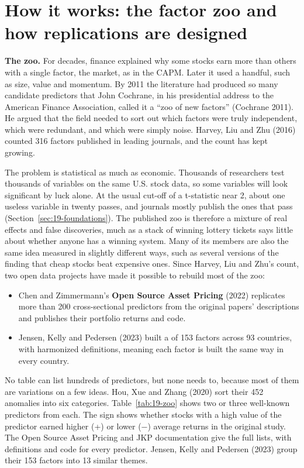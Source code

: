 \section{How it works: the factor zoo and how replications are designed}
\label{sec:19-how}

\textbf{The zoo.} For decades, finance explained why some stocks earn more than others with a single factor, the market, as in the CAPM. Later it used a handful, such as size, value and momentum. By 2011 the literature had produced so many candidate predictors that John Cochrane, in his presidential address to the American Finance Association, called it a ``zoo of new factors'' (Cochrane 2011). He argued that the field needed to sort out which factors were truly independent, which were redundant, and which were simply noise. Harvey, Liu and Zhu (2016) counted 316 factors published in leading journals, and the count has kept growing.

The problem is statistical as much as economic. Thousands of researchers test thousands of variables on the same U.S. stock data, so some variables will look significant by luck alone. At the usual cut-off of a t-statistic near 2, about one useless variable in twenty passes, and journals mostly publish the ones that pass (Section~\ref{sec:19-foundations}). The published zoo is therefore a mixture of real effects and false discoveries, much as a stack of winning lottery tickets says little about whether anyone has a winning system. Many of its members are also the same idea measured in slightly different ways, such as several versions of the finding that cheap stocks beat expensive ones. Since Harvey, Liu and Zhu's count, two open data projects have made it possible to rebuild most of the zoo:

\begin{itemize}
  \item Chen and Zimmermann's \textbf{Open Source Asset Pricing} (2022) replicates more than 200 cross-sectional predictors from the original papers' descriptions and publishes their portfolio returns and code.
  \item Jensen, Kelly and Pedersen (2023) built a  of 153 factors across 93 countries, with harmonized definitions, meaning each factor is built the same way in every country.
\end{itemize}

No table can list hundreds of predictors, but none needs to, because most of them are variations on a few ideas. Hou, Xue and Zhang (2020) sort their 452 anomalies into six categories. Table~\ref{tab:19-zoo} shows two or three well-known predictors from each. The sign shows whether stocks with a high value of the predictor earned higher (+) or lower ($-$) average returns in the original study. The Open Source Asset Pricing and JKP documentation give the full lists, with definitions and code for every predictor. Jensen, Kelly and Pedersen (2023) group their 153 factors into 13 similar themes.

